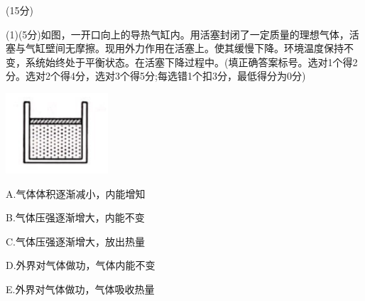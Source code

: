 \newpage
\question[6] [物理——选修$3–3$](15分)

(1)(5分)如图，一开口向上的导热气缸内。用活塞封闭了一定质量的理想气体，活塞与气缸壁间无摩擦。现用外力作用在活塞上。使其缓慢下降。环境温度保持不变，系统始终处于平衡状态。在活塞下降过程中。(填正确答案标号。选对1个得2分。选对2个得4分，选对3个得5分;每选错1个扣3分，最低得分为0分)\begin{center}\includegraphics[]{img/image11.png}\end{center}
A.气体体积逐渐减小，内能增知

B.气体压强逐渐增大，内能不变

C.气体压强逐渐增大，放出热量

D.外界对气体做功，气体内能不变

E.外界对气体做功，气体吸收热量


